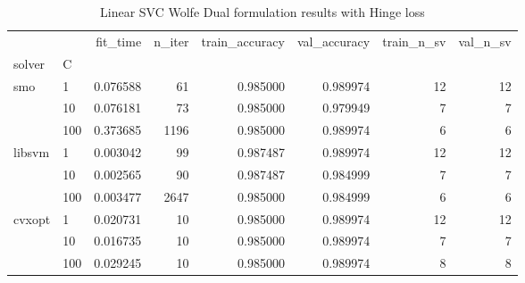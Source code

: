 \begin{table}[H]
\centering
\caption{Linear SVC Wolfe Dual formulation results with Hinge loss}
\label{linear_dual_svc_cv_results}
\begin{tabular}{llrrrrrr}
\toprule
       &     &  fit\_time &  n\_iter &  train\_accuracy &  val\_accuracy &  train\_n\_sv &  val\_n\_sv \\
solver & C &           &         &                 &               &             &           \\
\midrule
smo & 1   &  0.076588 &      61 &        0.985000 &      0.989974 &          12 &        12 \\
       & 10  &  0.076181 &      73 &        0.985000 &      0.979949 &           7 &         7 \\
       & 100 &  0.373685 &    1196 &        0.985000 &      0.989974 &           6 &         6 \\
libsvm & 1   &  0.003042 &      99 &        0.987487 &      0.989974 &          12 &        12 \\
       & 10  &  0.002565 &      90 &        0.987487 &      0.984999 &           7 &         7 \\
       & 100 &  0.003477 &    2647 &        0.985000 &      0.984999 &           6 &         6 \\
cvxopt & 1   &  0.020731 &      10 &        0.985000 &      0.989974 &          12 &        12 \\
       & 10  &  0.016735 &      10 &        0.985000 &      0.989974 &           7 &         7 \\
       & 100 &  0.029245 &      10 &        0.985000 &      0.989974 &           8 &         8 \\
\bottomrule
\end{tabular}
\end{table}
